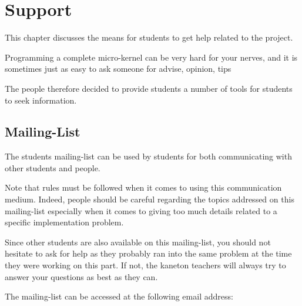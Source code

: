%
%
%
%
%
%

%
%

\chapter{Support}
\label{chapter:support}

This chapter discusses the means for students to get help related to
the project.

\newpage

%
%

Programming a complete micro-kernel can be very hard for your nerves, and
it is sometimes just as easy to ask someone for advise, opinion, tips \etc{}

The  people therefore decided to provide students a number of
tools for students to seek information.

%
%

\section{Mailing-List}

The students mailing-list can be used by students for both communicating with
other students and  people.

Note that rules must be followed when it comes to using this communication
medium. Indeed, people should be careful regarding the topics addressed
on this mailing-list especially when it comes to giving too much details
related to a specific implementation problem.

Since other students are also available on this mailing-list, you should not
hesitate to ask for help as they probably ran into the same problem at the
time they were working on this part. If not, the kaneton teachers will always
try to answer your questions as best as they can.

The mailing-list can be accessed at the following email address:

\begin{center}
\end{center}

